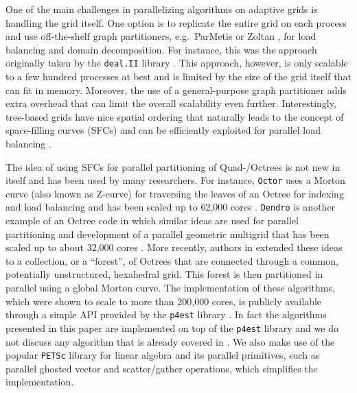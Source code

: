 One of the main challenges in parallelizing algorithms on adaptive grids is handling the grid itself. One option is to replicate the entire grid on each process and use off-the-shelf graph partitioners, e.g.\ ParMetis \cite{Karypis;Kumar:98:A-parallel-algorithm} or Zoltan \cite{Boman;Catalyurek;Chevalier;etal:12:The-Zoltan-and-Isorr}, for load balancing and domain decomposition. For instance, this was the approach originally taken by the \texttt{deal.II} library \cite{Bangerth;Hartmann;Kanschat:07:deal.II----a-General}. This approach, however, is only scalable to a few hundred processes at best and is limited by the size of the grid itself that can fit in memory. Moreover, the use of a general-purpose graph partitioner adds extra overhead that can limit the overall scalability even further. Interestingly, tree-based grids have nice spatial ordering that naturally leads to the concept of space-filling curves (SFCs) and can be efficiently exploited for parallel load balancing \cite{Aluru;Sevilgen:97:Parallel-domain-deco,Campbell;Devine;Flaherty;etal:03:Dynamic-octree-load-}.

The idea of using SFCs for parallel partitioning of Quad-/Octrees is not new in itself and has been used by many researchers. For instance, \texttt{Octor} \cite{Tu;OHallaron;Ghattas:05:Scalable-parallel-oc} uses a Morton curve (also known as Z-curve) for traversing the leaves of an Octree for indexing and load balancing and has been scaled up to 62,000 cores \cite{Burstedde;Ghattas;Gurnis;etal:08:Scalable-adaptive-ma}. \texttt{Dendro} \cite{Sampath;Adavani;Sundar;etal:08:Dendro:-parallel-alg} is another example of an Octree code in which similar ideas are used for parallel partitioning and development of a parallel geometric multigrid that has been scaled up to about 32,000 cores \cite{Sampath;Biros:10:A-parallel-geometric}. More recently, authors in \cite{Burstedde;Wilcox;Ghattas:11:p4est:-Scalable-Algo} extended these ideas to a collection, or a ``forest'', of Octrees that are connected through a common, potentially unstructured, hexahedral grid. This forest is then partitioned in parallel using a global Morton curve. The implementation of these algorithms, which were shown to scale to more than 200,000 cores, is publicly available through a simple API provided by the \texttt{p4est} library \cite{p4est-github}. In fact the algorithms presented in this paper are implemented on top of the \texttt{p4est} library and we do not discuss any algorithm that is already covered in \cite{Burstedde;Wilcox;Ghattas:11:p4est:-Scalable-Algo}. We also make use of the popular \texttt{PETSc} \cite{Balay;Abhyankar;Adams;etal:14:PETSc-Web-page} library for linear algebra and its parallel primitives, such as parallel ghosted vector and scatter/gather operations, which simplifies the implementation. 

